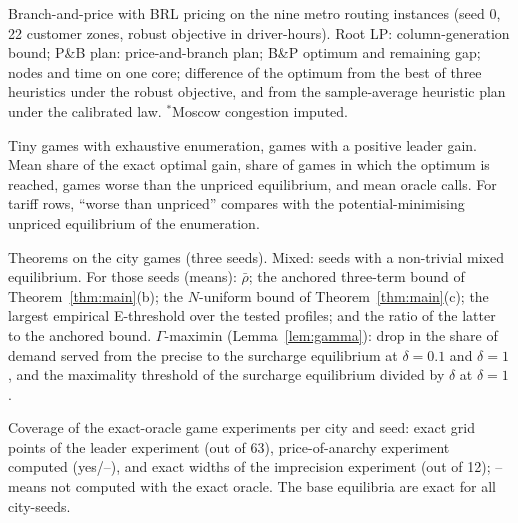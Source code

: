 \documentclass[preprint,11pt]{elsarticle}
\theoremstyle{definition}
\theoremstyle{remark}
\begin{document}
\begin{table}[h]\centering\small
\caption{Branch-and-price with BRL pricing on the nine metro routing instances (seed 0, 22 customer zones, robust objective in driver-hours). Root LP: column-generation bound; P\&B plan: price-and-branch plan; B\&P optimum and remaining gap; nodes and time on one core; difference of the optimum from the best of three heuristics under the robust objective, and from the sample-average heuristic plan under the calibrated law. $^*$Moscow congestion imputed.}\label{tab:brl-metro}
\end{table}

\begin{table}[h]\centering\small
\caption{Tiny games with exhaustive enumeration, games with a positive leader gain. Mean share of the exact optimal gain, share of games in which the optimum is reached, games worse than the unpriced equilibrium, and mean oracle calls. For tariff rows, ``worse than unpriced'' compares with the potential-minimising unpriced equilibrium of the enumeration.}\label{tab:arp-tiny}
\end{table}

\begin{table}[h]\centering\small
\caption{Theorems on the city games (three seeds). Mixed: seeds with a non-trivial mixed equilibrium. For those seeds (means): $\bar\rho$; the anchored three-term bound of Theorem~\ref{thm:main}(b); the $N$-uniform bound of Theorem~\ref{thm:main}(c); the largest empirical E-threshold over the tested profiles; and the ratio of the latter to the anchored bound. $\Gamma$-maximin (Lemma~\ref{lem:gamma}): drop in the share of demand served from the precise to the surcharge equilibrium at $\delta=0.1$ and $\delta=1$, and the maximality threshold of the surcharge equilibrium divided by $\delta$ at $\delta=1$.}\label{tab:theory}
\end{table}

\begin{table}[h]\centering\small
\caption{Coverage of the exact-oracle game experiments per city and seed: exact grid points of the leader experiment (out of 63), price-of-anarchy experiment computed (yes/--), and exact widths of the imprecision experiment (out of 12); -- means not computed with the exact oracle. The base equilibria are exact for all city-seeds.}\label{tab:coverage}
\end{table}
\end{document}
